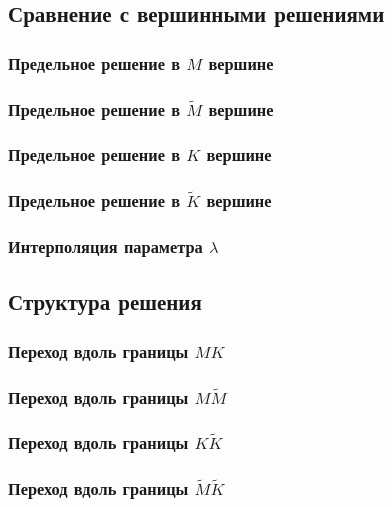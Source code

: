 \documentclass[main.tex]{subfiles}
\begin{document}
\subsection{Сравнение с вершинными решениями}

\subsubsection{Предельное решение в $M$ вершине}

\subsubsection{Предельное решение в $\tilde{M}$ вершине}

\subsubsection{Предельное решение в $K$ вершине}

\subsubsection{Предельное решение в $\tilde{K}$ вершине}

\subsubsection{Интерполяция параметра $\lambda$}

\subsection{Структура решения}

\subsubsection{Переход вдоль границы $MK$}

\subsubsection{Переход вдоль границы $M\tilde{M}$}

\subsubsection{Переход вдоль границы $K\tilde{K}$}

\subsubsection{Переход вдоль границы $\tilde{M}\tilde{K}$}
\end{document}
